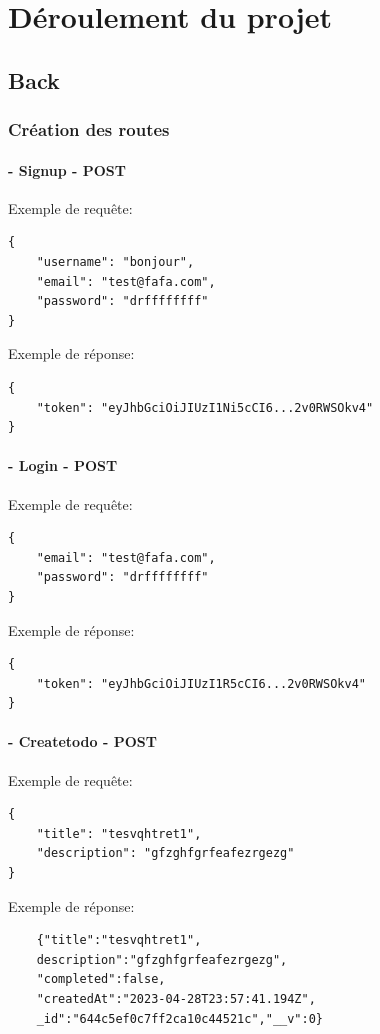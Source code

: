 \documentclass[a4paper,12pt]{report}
\begin{document}
\chapter{Déroulement du projet}

\section{Back}
\subsection{Création des routes}
\subsubsection{- Signup - POST}
Exemple de requête:
\begin{lstlisting}
{
	"username": "bonjour",
	"email": "test@fafa.com",
	"password": "drffffffff"
}
\end{lstlisting}

Exemple de réponse:
\begin{lstlisting}
{
	"token": "eyJhbGciOiJIUzI1Ni5cCI6...2v0RWSOkv4"
}
\end{lstlisting}

\subsubsection{- Login - POST}
Exemple de requête:
\begin{lstlisting}
{
  	"email": "test@fafa.com",
  	"password": "drffffffff"
}
\end{lstlisting}

Exemple de réponse:
\begin{lstlisting}
{
	"token": "eyJhbGciOiJIUzI1R5cCI6...2v0RWSOkv4"
}
\end{lstlisting}
\subsubsection{- Createtodo - POST}
Exemple de requête:
\begin{lstlisting}
{
	"title": "tesvqhtret1",
	"description": "gfzghfgrfeafezrgezg"
}
\end{lstlisting}

Exemple de réponse:
\begin{lstlisting}
	{"title":"tesvqhtret1",
	description":"gfzghfgrfeafezrgezg",
	"completed":false,
	"createdAt":"2023-04-28T23:57:41.194Z",
	_id":"644c5ef0c7ff2ca10c44521c","__v":0}
\end{lstlisting}
\end{document}

